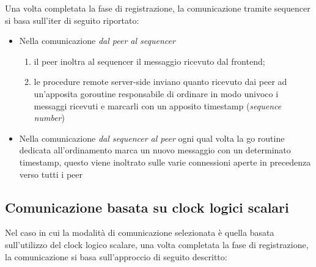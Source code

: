 \documentclass[conference]{IEEEtran}
\begin{document}
Una volta completata la fase di registrazione, la comunicazione tramite sequencer si basa sull'iter di seguito riportato:

\begin{itemize}
\item Nella comunicazione \textsl{dal peer al sequencer}
\begin{enumerate}
\item il peer inoltra al sequencer il messaggio ricevuto dal frontend; 
\item le procedure remote server-side inviano quanto ricevuto dai peer ad un'apposita goroutine responsabile di ordinare in modo univoco i messaggi ricevuti e marcarli con un apposito timestamp (\textit{sequence number})
\end{enumerate}

\item Nella comunicazione \textsl{dal sequencer al peer} ogni qual volta la go routine dedicata all'ordinamento marca un nuovo messaggio con un determinato timestamp, questo viene inoltrato sulle varie connessioni aperte in precedenza verso tutti i peer
\end{itemize}

\subsection{Comunicazione basata su clock logici scalari}
Nel caso in cui la modalità di comunicazione selezionata è quella basata sull'utilizzo del clock logico scalare, una volta completata la fase di registrazione, la comunicazione si basa sull'approccio di seguito descritto:
\end{document}
